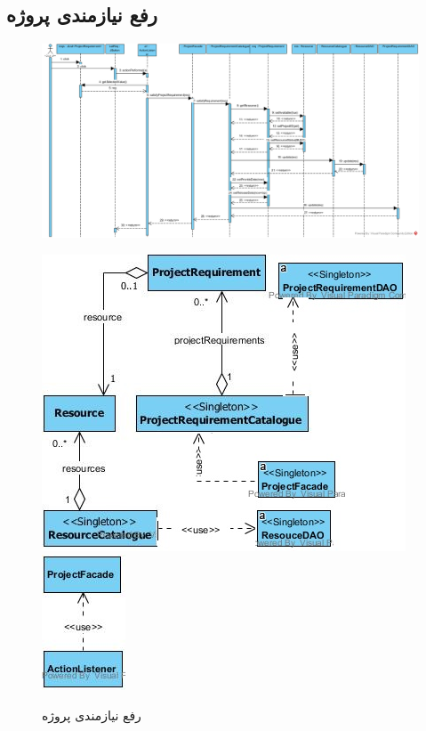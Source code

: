 \begin{landscape}
\newpage
\section{رفع نیازمندی پروژه}
\begin{figure}[H]
	\centering
	\includegraphics[scale=0.6]{img/sequence-design/SatisfyResourceOfProject}
\end{figure}
\begin{figure}[H]
	\centering
	\includegraphics[scale=0.8]{img/sequence-design/SatisfyResourceOfProjectC}
	\includegraphics[scale=0.8]{img/sequence-design/SatisfyResourceOfProjectUI}
\caption{رفع نیازمندی پروژه}
\end{figure}


\end{landscape}
